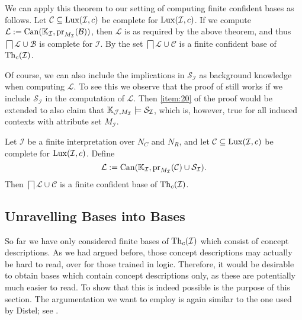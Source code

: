 We can apply this theorem to our setting of computing finite confident bases as follows.
Let $\mathcal{C} \subseteq \operatorname{Lux}(\mathcal{I}, c)$ be complete for $\operatorname{Lux}(\mathcal{I}, c)$.
If we compute $\mathcal{L} := \operatorname{Can}({\mathbb{K}}_{\mathcal{I}},
\operatorname{pr}_{M_{\mathcal{I}}}(\mathcal{B}))$, then $\mathcal{L}$ is as required by the above
theorem, and thus $\bigsqcap \mathcal{L} \cup \mathcal{B}$ is complete for $\mathcal{I}$.
By  the set $\bigsqcap \mathcal{L} \cup
\mathcal{C}$ is a finite confident base of $\operatorname{Th}_c(\mathcal{I})$.

Of course, we can also include the implications in $\mathcal{S}_{\mathcal{I}}$ as
background knowledge when computing $\mathcal{L}$.  To see this we observe that the proof
of  still works if we include
$\mathcal{S}_{\mathcal{I}}$ in the computation of $\mathcal{L}$.  Then \cref{item:20} of
the proof would be extended to also claim that ${\mathbb{K}}_{\mathcal{J}, M_{\mathcal{I}}}
\models \mathcal{S}_{\mathcal{I}}$, which is, however, true for all induced contexts with
attribute set $M_{\mathcal{I}}$.

\begin{Corollary}
  \label{cor:gci-completion-with-S_I}
  Let $\mathcal{I}$ be a finite interpretation over $N_C$ and $N_R$, and let $\mathcal{C}
  \subseteq \operatorname{Lux}(\mathcal{I}, c)$ be complete for $\operatorname{Lux}(\mathcal{I}, c)$.  Define
  \begin{equation*}
    \mathcal{L} := \operatorname{Can}({\mathbb{K}}_{\mathcal{I}}, \operatorname{pr}_{M_{\mathcal{I}}}(\mathcal{C}) \cup \mathcal{S}_{\mathcal{I}}).
  \end{equation*}
  Then $\bigsqcap \mathcal{L} \cup \mathcal{C}$ is a finite confident base of
  $\operatorname{Th}_c(\mathcal{I})$.
\end{Corollary}

\subsection{Unravelling \ELgfpbot Bases into \ELbot Bases}
\label{sec:unrav-elgfpb-bases}

So far we have only considered finite bases of $\operatorname{Th}_c(\mathcal{I})$ which consist of
\ELgfpbot concept descriptions.  As we had argued before, those concept descriptions may
actually be hard to read, over for those trained in logic.  Therefore, it would be
desirable to obtain bases which contain \ELbot concept descriptions only, as these are
potentially much easier to read.  To show that this is indeed possible is the purpose of
this section.  The argumentation we want to employ is again similar to the one used by
Distel; see .

